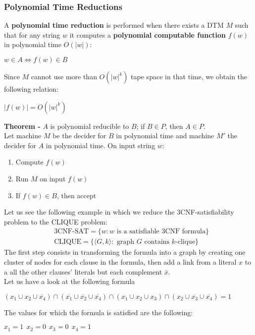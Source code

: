 \documentclass{article}
\begin{document}
\subsubsection{Polynomial Time Reductions}
A \textbf{polynomial time reduction} is performed when there exists a DTM $M$ such that for any string $w$ it computes a \textbf{polynomial computable function} $f(w)$ in polynomial time $O(|w|)$:
\begin{center}
    $w \in A \Leftrightarrow f(w) \in B$
\end{center}
Since $M$ cannot use more than $O(|w|^k)$ tape space in that time, we obtain the following relation:
\begin{center}
    $|f(w)| = O(|w|^k)$
\end{center}
\textbf{Theorem - }  $A$ is polynomial reducible to $B$; if $B\in P$, then $A \in P$. \\
Let machine $M$ be the decider for $B$ in polynomial time and machine $M'$ the decider for $A$ in polynomial time. On input string $w$:
\begin{enumerate}
    \item Compute $f(w)$
    \item Run $M$ on input $f(w)$
    \item If $f(w) \in B$, then accept
\end{enumerate}
Let us see the following example in which we reduce the $3$CNF-satisfiability problem to the CLIQUE problem:
\begin{align*}
    &3\text{CNF-SAT} =\{ w : w \text{ is a satisfiable 3CNF formula}\} \\
    &\text{CLIQUE} = \{\langle G,k\rangle : \text{ graph } G \text{ contains } k\text{-clique}\}
\end{align*}
The first step consists in transforming the formula into a graph by creating one cluster of nodes for each clause in the formula, then add a link from a literal $x$ to a all the other clauses' literals but each complement $\bar{x}$. \\
Let us have a look at the following formula
\begin{center}
    $(x_1 \cup x_2 \cup \overline{x_4}) \cap (\overline{x_1} \cup \overline{x_2} \cup \overline{x_4}) \cap (x_1 \cup x_2 \cup x_3)\cap(x_2 \cup \overline{x_3} \cup \overline{x_4}) = 1$
\end{center}
The values for which the formula is satisfied are the following:
\begin{center}
    $x_1 = 1 \ \ x_2 = 0 \ \ x_3 = 0 \ \ x_4 = 1$
\end{center}
\end{document}
